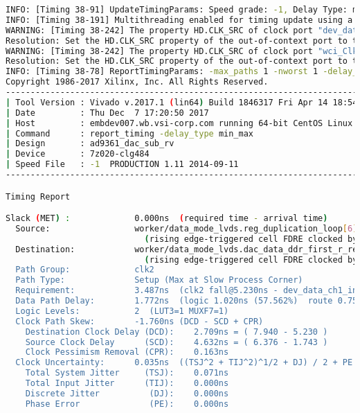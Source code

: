 \documentclass{article}
\begin{document}
\begin{lstlisting}[language=bash]
INFO: [Timing 38-91] UpdateTimingParams: Speed grade: -1, Delay Type: min_max.
INFO: [Timing 38-191] Multithreading enabled for timing update using a maximum of 8 CPUs
WARNING: [Timing 38-242] The property HD.CLK_SRC of clock port "dev_data_clk_in[DATA_CLK_P]" is not set. In out-of-context mode, this prevents timing estimation for clock delay/skew
Resolution: Set the HD.CLK_SRC property of the out-of-context port to the location of the clock buffer instance in the top-level design
WARNING: [Timing 38-242] The property HD.CLK_SRC of clock port "wci_Clk" is not set. In out-of-context mode, this prevents timing estimation for clock delay/skew
Resolution: Set the HD.CLK_SRC property of the out-of-context port to the location of the clock buffer instance in the top-level design
INFO: [Timing 38-78] ReportTimingParams: -max_paths 1 -nworst 1 -delay_type min_max -sort_by slack.
Copyright 1986-2017 Xilinx, Inc. All Rights Reserved.
-----------------------------------------------------------------------------------------------
| Tool Version : Vivado v.2017.1 (lin64) Build 1846317 Fri Apr 14 18:54:47 MDT 2017
| Date         : Thu Dec  7 17:20:50 2017
| Host         : embdev007.wb.vsi-corp.com running 64-bit CentOS Linux release 7.2.1511 (Core)
| Command      : report_timing -delay_type min_max
| Design       : ad9361_dac_sub_rv
| Device       : 7z020-clg484
| Speed File   : -1  PRODUCTION 1.11 2014-09-11
-----------------------------------------------------------------------------------------------

Timing Report

Slack (MET) :             0.000ns  (required time - arrival time)
  Source:                 worker/data_mode_lvds.reg_duplication_loop[6].dacd2_ch0_i_r_reg[6]/C
                            (rising edge-triggered cell FDRE clocked by dev_data_ch1_in_out[dac_clk]  {rise@1.743ns fall@5.230ns period=6.974ns})
  Destination:            worker/data_mode_lvds.dac_data_ddr_first_r_reg[0]/D
                            (rising edge-triggered cell FDRE clocked by clk2'  {rise@0.000ns fall@1.743ns period=3.487ns})
  Path Group:             clk2
  Path Type:              Setup (Max at Slow Process Corner)
  Requirement:            3.487ns  (clk2 fall@5.230ns - dev_data_ch1_in_out[dac_clk] rise@1.743ns)
  Data Path Delay:        1.772ns  (logic 1.020ns (57.562%)  route 0.752ns (42.438%))
  Logic Levels:           2  (LUT3=1 MUXF7=1)
  Clock Path Skew:        -1.760ns (DCD - SCD + CPR)
    Destination Clock Delay (DCD):    2.709ns = ( 7.940 - 5.230 ) 
    Source Clock Delay      (SCD):    4.632ns = ( 6.376 - 1.743 ) 
    Clock Pessimism Removal (CPR):    0.163ns
  Clock Uncertainty:      0.035ns  ((TSJ^2 + TIJ^2)^1/2 + DJ) / 2 + PE
    Total System Jitter     (TSJ):    0.071ns
    Total Input Jitter      (TIJ):    0.000ns
    Discrete Jitter          (DJ):    0.000ns
    Phase Error              (PE):    0.000ns


\end{lstlisting}
\end{document}
